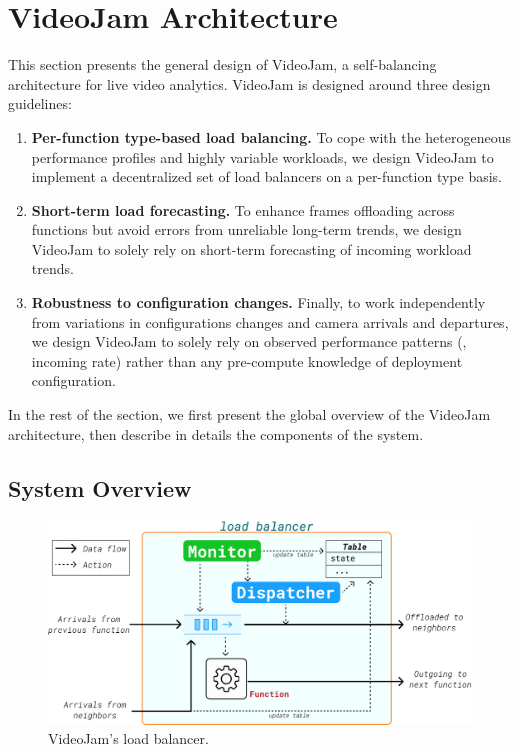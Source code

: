 \section{VideoJam Architecture}\label{sec:architecture}

This section presents the general design of VideoJam, a self-balancing architecture for live video analytics. VideoJam is designed around three design guidelines:
\begin{enumerate}[leftmargin=*]
    \item \textbf{Per-function type-based load balancing.} To cope with the heterogeneous performance profiles and highly variable workloads, we design VideoJam to implement a decentralized set of load balancers on a per-function type basis.
    \item \textbf{Short-term load forecasting.} To enhance frames offloading across functions but avoid errors from unreliable long-term trends, we design VideoJam to solely rely on short-term forecasting of incoming workload trends.
    \item \textbf{Robustness to configuration changes.} Finally, to work independently from variations in configurations changes and camera arrivals
    and departures, we design VideoJam to solely rely on observed performance patterns (\eg, incoming rate) rather than any pre-compute knowledge of
    deployment configuration.
\end{enumerate}

In the rest of the section, we first present the global overview of the VideoJam architecture, then describe in details the components of the system.

\subsection{System Overview}

\begin{figure}
    \centering
    \includegraphics[width=\linewidth]{chapters/videojam/images/videojam_architecture.pdf}
    \caption{VideoJam's load balancer.}
    \label{fig:load_balancer}
\end{figure}

